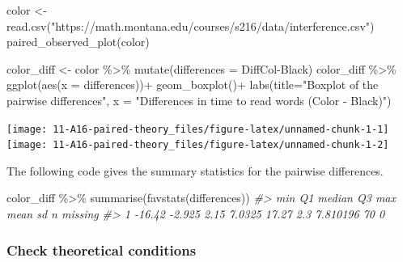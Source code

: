 \documentclass[
]{report}
\newenvironment{Shaded}{\begin{snugshade}}{\end{snugshade}}
\newcommand{\AttributeTok}[1]{\textcolor[rgb]{0.77,0.63,0.00}{#1}}
\newcommand{\CommentTok}[1]{\textcolor[rgb]{0.56,0.35,0.01}{\textit{#1}}}
\newcommand{\FunctionTok}[1]{\textcolor[rgb]{0.00,0.00,0.00}{#1}}
\newcommand{\NormalTok}[1]{#1}
\newcommand{\OtherTok}[1]{\textcolor[rgb]{0.56,0.35,0.01}{#1}}
\newcommand{\SpecialCharTok}[1]{\textcolor[rgb]{0.00,0.00,0.00}{#1}}
\newcommand{\StringTok}[1]{\textcolor[rgb]{0.31,0.60,0.02}{#1}}
\begin{document}
\begin{Shaded}
\begin{Highlighting}[]
\NormalTok{color }\OtherTok{\textless{}{-}} \FunctionTok{read.csv}\NormalTok{(}\StringTok{"https://math.montana.edu/courses/s216/data/interference.csv"}\NormalTok{)}
\FunctionTok{paired\_observed\_plot}\NormalTok{(color)}

\NormalTok{color\_diff }\OtherTok{\textless{}{-}}\NormalTok{ color }\SpecialCharTok{\%\textgreater{}\%} 
  \FunctionTok{mutate}\NormalTok{(}\AttributeTok{differences =}\NormalTok{ DiffCol}\SpecialCharTok{{-}}\NormalTok{Black)}
\NormalTok{color\_diff }\SpecialCharTok{\%\textgreater{}\%}
  \FunctionTok{ggplot}\NormalTok{(}\FunctionTok{aes}\NormalTok{(}\AttributeTok{x =}\NormalTok{ differences))}\SpecialCharTok{+}
  \FunctionTok{geom\_boxplot}\NormalTok{()}\SpecialCharTok{+}
  \FunctionTok{labs}\NormalTok{(}\AttributeTok{title=}\StringTok{"Boxplot of the pairwise differences"}\NormalTok{,}
       \AttributeTok{x =} \StringTok{"Differences in time to read words (Color {-} Black)"}\NormalTok{)}
\end{Highlighting}
\end{Shaded}

\begin{center}\texttt{[image: 11-A16-paired-theory\_files/figure-latex/unnamed-chunk-1-1]} \texttt{[image: 11-A16-paired-theory\_files/figure-latex/unnamed-chunk-1-2]} \end{center}

The following code gives the summary statistics for the pairwise differences.

\begin{Shaded}
\begin{Highlighting}[]
\NormalTok{color\_diff }\SpecialCharTok{\%\textgreater{}\%} 
  \FunctionTok{summarise}\NormalTok{(}\FunctionTok{favstats}\NormalTok{(differences))}
\CommentTok{\#\textgreater{}      min     Q1 median     Q3   max mean       sd  n missing}
\CommentTok{\#\textgreater{} 1 {-}16.42 {-}2.925   2.15 7.0325 17.27  2.3 7.810196 70       0}
\end{Highlighting}
\end{Shaded}

\hypertarget{check-theoretical-conditions}{%
\subsubsection*{Check theoretical conditions}\label{check-theoretical-conditions}}
\end{document}

